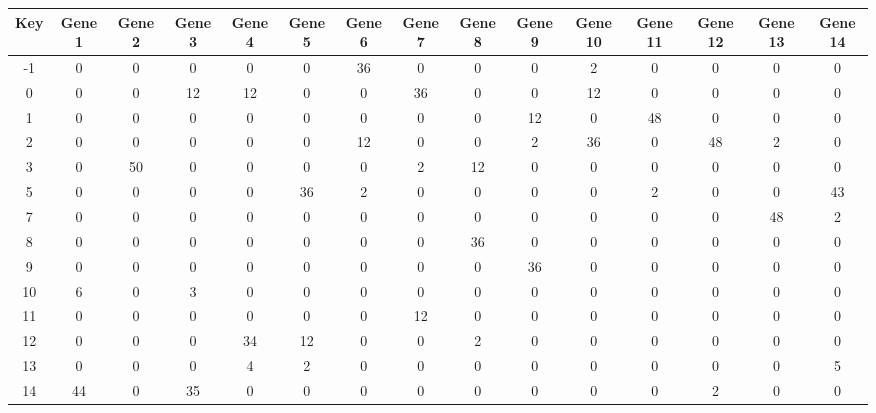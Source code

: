 \begin{tabular}{|c|c|c|c|c|c|c|c|c|c|c|c|c|c|c|}
\hline
Key & Gene 1 & Gene 2 & Gene 3 & Gene 4 & Gene 5 & Gene 6 & Gene 7 & Gene 8 & Gene 9 & Gene 10 & Gene 11 & Gene 12 & Gene 13 & Gene 14 \\
\hline
-1 & 0 & 0 & 0 & 0 & 0 & 36 & 0 & 0 & 0 & 2 & 0 & 0 & 0 & 0 \\
0 & 0 & 0 & 12 & 12 & 0 & 0 & 36 & 0 & 0 & 12 & 0 & 0 & 0 & 0 \\
1 & 0 & 0 & 0 & 0 & 0 & 0 & 0 & 0 & 12 & 0 & 48 & 0 & 0 & 0 \\
2 & 0 & 0 & 0 & 0 & 0 & 12 & 0 & 0 & 2 & 36 & 0 & 48 & 2 & 0 \\
3 & 0 & 50 & 0 & 0 & 0 & 0 & 2 & 12 & 0 & 0 & 0 & 0 & 0 & 0 \\
5 & 0 & 0 & 0 & 0 & 36 & 2 & 0 & 0 & 0 & 0 & 2 & 0 & 0 & 43 \\
7 & 0 & 0 & 0 & 0 & 0 & 0 & 0 & 0 & 0 & 0 & 0 & 0 & 48 & 2 \\
8 & 0 & 0 & 0 & 0 & 0 & 0 & 0 & 36 & 0 & 0 & 0 & 0 & 0 & 0 \\
9 & 0 & 0 & 0 & 0 & 0 & 0 & 0 & 0 & 36 & 0 & 0 & 0 & 0 & 0 \\
10 & 6 & 0 & 3 & 0 & 0 & 0 & 0 & 0 & 0 & 0 & 0 & 0 & 0 & 0 \\
11 & 0 & 0 & 0 & 0 & 0 & 0 & 12 & 0 & 0 & 0 & 0 & 0 & 0 & 0 \\
12 & 0 & 0 & 0 & 34 & 12 & 0 & 0 & 2 & 0 & 0 & 0 & 0 & 0 & 0 \\
13 & 0 & 0 & 0 & 4 & 2 & 0 & 0 & 0 & 0 & 0 & 0 & 0 & 0 & 5 \\
14 & 44 & 0 & 35 & 0 & 0 & 0 & 0 & 0 & 0 & 0 & 0 & 2 & 0 & 0 \\
\hline
\end{tabular}